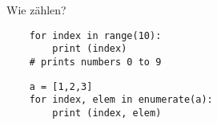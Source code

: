 \begin{frame}[fragile]{Wie zählen?}
    \begin{lstlisting}
    for index in range(10):
        print (index)
    # prints numbers 0 to 9
    \end{lstlisting}
    \begin{lstlisting}
    a = [1,2,3]
    for index, elem in enumerate(a):
        print (index, elem)
    \end{lstlisting}
\end{frame}


